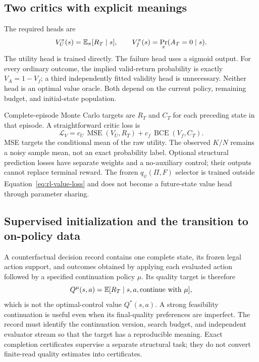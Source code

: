 \subsection{Two critics with explicit meanings}

The required heads are
\begin{equation}
 V_U^\pi(s)=\mathbb{E}_\pi[R_T\mid s],\qquad
 V_f^\pi(s)=\Pr_\pi(A_T=0\mid s).
 \label{eq:rl-critics}
\end{equation}
The utility head is trained directly. The failure head uses a sigmoid output. For every ordinary
outcome, the implied valid-return probability is exactly \(V_A=1-V_f\); a third independently
fitted validity head is unnecessary. Neither head is an optimal value oracle. Both depend on the
current policy, remaining budget, and initial-state population.

Complete-episode Monte Carlo targets are \(R_T\) and \(C_T\) for each preceding state in that
episode. A straightforward critic loss is
\begin{equation}
 \mathcal L_V=
 c_U\,\operatorname{MSE}(V_U,R_T)
 +c_f\,\operatorname{BCE}(V_f,C_T).
 \label{eq:rl-value-loss}
\end{equation}
MSE targets the conditional mean of the raw utility. The observed \(K/N\) remains a noisy sample
mean, not an exact probability label. Optional structural prediction losses have separate weights
and a no-auxiliary control; their outputs cannot replace terminal reward. The frozen
\(q_\psi(\Pi,F)\) selector is trained outside Equation~\eqref{eq:rl-value-loss} and does not become
a future-state value head through parameter sharing.

\subsection{Supervised initialization and the transition to on-policy data}

A counterfactual decision record contains one complete state, its frozen legal action support, and
outcomes obtained by applying each evaluated action followed by a specified continuation policy
\(\mu\). Its quality target is therefore
\[
 Q^\mu(s,a)=\mathbb{E}[R_T\mid s,a,\text{continue with }\mu],
\]
which is not the optimal-control value \(Q^*(s,a)\). A strong feasibility continuation is useful
even when its final-quality preferences are imperfect. The record must identify the continuation
version, search budget, and independent evaluator stream so that the target has a reproducible
meaning. Exact completion certificates supervise a separate structural task; they do not convert
finite-read quality estimates into certificates.

